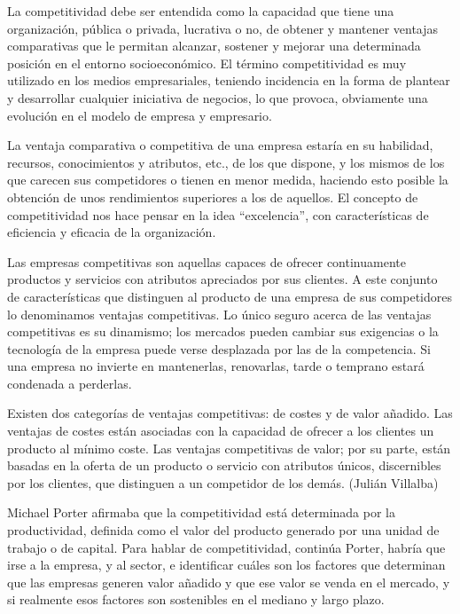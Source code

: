 La competitividad debe ser entendida como la capacidad que tiene una organización, pública o privada, lucrativa o no, de
obtener y mantener ventajas comparativas que le permitan alcanzar, sostener y mejorar una determinada posición en el entorno
socioeconómico. El término competitividad es muy utilizado en los medios empresariales, teniendo incidencia en la forma de
plantear y desarrollar cualquier iniciativa de negocios, lo que provoca, obviamente una evolución en el modelo de empresa y
empresario.

La ventaja comparativa o competitiva de una empresa estaría en su habilidad, recursos, conocimientos y atributos, etc., de los
que dispone, y los mismos de los que carecen sus competidores o tienen en menor medida, haciendo esto posible la obtención de
unos rendimientos superiores a los de aquellos. El concepto de competitividad nos hace pensar en la idea “excelencia”, con
características de eficiencia y eficacia de la organización.

Las empresas competitivas son aquellas capaces de ofrecer continuamente productos y servicios con atributos apreciados por sus
clientes. A este conjunto de características que distinguen al producto de una empresa de sus competidores lo denominamos
ventajas competitivas. Lo único seguro acerca de las ventajas competitivas es su dinamismo; los mercados pueden cambiar sus
exigencias o la tecnología de la empresa puede verse desplazada por las de la competencia. Si una empresa no invierte en
mantenerlas, renovarlas, tarde o temprano estará condenada a perderlas.

Existen dos categorías de ventajas competitivas: de costes y de valor añadido. Las ventajas de costes están asociadas con la
capacidad de ofrecer a los clientes un producto al mínimo coste. Las ventajas competitivas de valor; por su parte, están
basadas en la oferta de un producto o servicio con atributos únicos, discernibles por los clientes, que distinguen a un
competidor de los demás. (Julián Villalba)

Michael Porter afirmaba que la competitividad está determinada por la productividad, definida como el valor del producto
generado por una unidad de trabajo o de capital. Para hablar de competitividad, continúa Porter, habría que irse a la empresa,
y al sector, e identificar cuáles son los factores que determinan que las empresas generen valor añadido y que ese valor se
venda en el mercado, y si realmente esos factores son sostenibles en el mediano y largo plazo.

